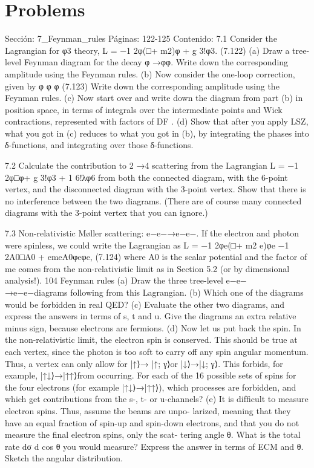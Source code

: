\section*{Problems}
Sección: 7_Feynman_rules
Páginas: 122-125
Contenido:
7.1 Consider the Lagrangian for φ3 theory,
L = −1
2φ(□+ m2)φ + g
3!φ3.
(7.122)
(a) Draw a tree-level Feynman diagram for the decay φ →φφ. Write down the
corresponding amplitude using the Feynman rules.
(b) Now consider the one-loop correction, given by
φ
φ
φ
(7.123)
Write down the corresponding amplitude using the Feynman rules.
(c) Now start over and write down the diagram from part (b) in position space,
in terms of integrals over the intermediate points and Wick contractions,
represented with factors of DF .
(d) Show that after you apply LSZ, what you got in (c) reduces to what you got
in (b), by integrating the phases into δ-functions, and integrating over those
δ-functions.

7.2 Calculate the contribution to 2 →4 scattering from the Lagrangian L = −1
2φ□φ+
g
3!φ3 + 1
6!λφ6 from both the connected diagram, with the 6-point vertex, and the
disconnected diagram with the 3-point vertex. Show that there is no interference
between the two diagrams. (There are of course many connected diagrams with the
3-point vertex that you can ignore.)

7.3 Non-relativistic Møller scattering: e−e−→e−e−. If the electron and photon were
spinless, we could write the Lagrangian as
L = −1
2φe(□+ m2
e)φe −1
2A0□A0 + emeA0φeφe,
(7.124)
where A0 is the scalar potential and the factor of me comes from the non-relativistic
limit as in Section 5.2 (or by dimensional analysis!).
104
Feynman rules
(a) Draw the three tree-level e−e−
→e−e−diagrams following from this
Lagrangian.
(b) Which one of the diagrams would be forbidden in real QED?
(c) Evaluate the other two diagrams, and express the answers in terms of s, t and u.
Give the diagrams an extra relative minus sign, because electrons are fermions.
(d) Now let us put back the spin. In the non-relativistic limit, the electron spin is
conserved. This should be true at each vertex, since the photon is too soft to
carry off any spin angular momentum. Thus, a vertex can only allow for |↑⟩→
|↑; γ⟩or |↓⟩→|↓; γ⟩. This forbids, for example, |↑↓⟩→|↑↑⟩from occurring.
For each of the 16 possible sets of spins for the four electrons (for example
|↑↓⟩→|↑↑⟩), which processes are forbidden, and which get contributions from
the s-, t- or u-channels?
(e) It is difﬁcult to measure electron spins. Thus, assume the beams are unpo-
larized, meaning that they have an equal fraction of spin-up and spin-down
electrons, and that you do not measure the ﬁnal electron spins, only the scat-
tering angle θ. What is the total rate
dσ
d cos θ you would measure? Express the
answer in terms of ECM and θ. Sketch the angular distribution.

